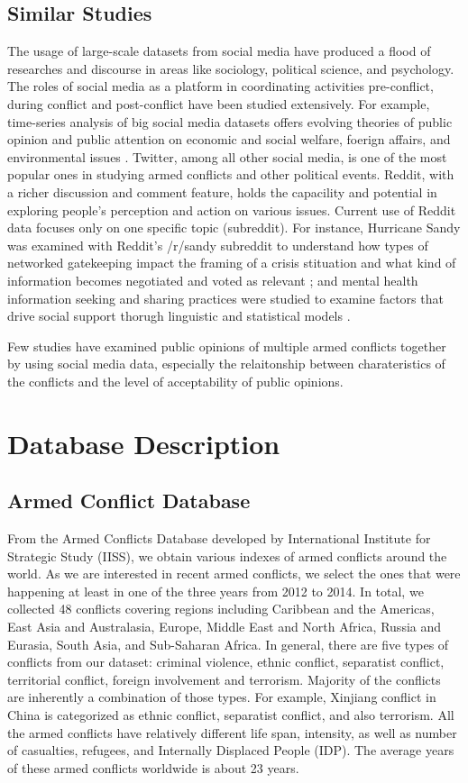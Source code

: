 \subsection{Similar Studies}
The usage of large-scale datasets from social media have produced a flood of researches and discourse in areas like sociology, political science, and psychology. The roles of social media as a platform in coordinating activities pre-conflict, during conflict and post-conflict have been studied extensively. For example, time-series analysis of big social media datasets offers evolving theories of public opinion and public attention on economic and social welfare, foerign affairs, and environmental issues \cite{RussellNeuman2014}. Twitter, among all other social media, is one of the most popular ones in studying armed conflicts and other political events. Reddit, with a richer discussion and comment feature, holds the capacility and potential in exploring people's perception and action on various issues. Current use of Reddit data focuses only on one specific topic (subreddit). For instance, Hurricane Sandy was examined with Reddit's /r/sandy subreddit to understand how types of networked gatekeeping impact the framing of a crisis stituation and what kind of information becomes negotiated and voted as relevant \cite{Leavitt}; and mental health information seeking and sharing practices were studied to examine factors that drive social support thorugh linguistic and statistical models \cite{dechoudhury2014mental}.

Few studies have examined public opinions of multiple armed conflicts together by using social media data, especially the relaitonship between charateristics of the conflicts and the level of acceptability of public opinions.

\section{Database Description}
\subsection{Armed Conflict Database}
From the Armed Conflicts Database developed by International Institute for Strategic Study (IISS), we obtain various indexes of armed conflicts around the world. As we are interested in recent armed conflicts, we select the ones that were happening at least in one of the three years from 2012 to 2014. In total, we collected 48 conflicts covering regions including Caribbean and the Americas, East Asia and Australasia, Europe, Middle East and North Africa, Russia and Eurasia, South Asia, and Sub-Saharan Africa. In general, there are five types of conflicts from our dataset: criminal violence, ethnic conflict, separatist conflict, territorial conflict, foreign involvement and terrorism. Majority of the conflicts are inherently a combination of those types. For example, Xinjiang conflict in China is categorized as ethnic conflict, separatist conflict, and also terrorism. All the armed conflicts have relatively different life span, intensity, as well as number of casualties, refugees, and Internally Displaced People (IDP). The average years of these armed conflicts worldwide is about 23 years.

